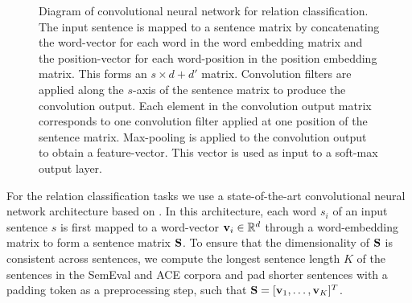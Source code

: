 \begin{figure}[h!]
	\caption{Diagram of convolutional neural network for relation classification. The input sentence is mapped to a sentence matrix by concatenating the word-vector for each word in the word embedding matrix and the position-vector for each word-position in the position embedding matrix. This forms an $s \times d + d'$ matrix. Convolution filters are applied along the $s$-axis of the sentence matrix to produce the convolution output. Each element in the convolution output matrix corresponds to one convolution filter applied at one position of the sentence matrix. Max-pooling is applied to the convolution output to obtain a feature-vector. This vector is used as input to a soft-max output layer.}
	\label{relation_architecture}
\end{figure}
For the relation classification tasks we use a state-of-the-art convolutional neural network architecture based on \citet{nguyen2015}. In this architecture, each word $s_i$ of an input sentence $s$ is first mapped to a word-vector $\mathbf{v}_i \in \mathbb{R}^d$ through a word-embedding matrix to form a sentence matrix $\mathbf{S}$. To ensure that the dimensionality of $\mathbf{S}$ is consistent across sentences, we compute the longest sentence length $K$ of the sentences in the SemEval and ACE corpora and pad shorter sentences with a padding token as a preprocessing step, such that $\mathbf{S} = [\mathbf{v}_1, \dots, \mathbf{v}_K]^T$.

